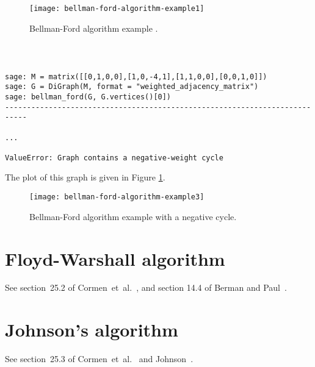 \begin{figure}[h!]
\begin{center}
\texttt{[image: bellman-ford-algorithm-example1]}
\end{center}
\caption{Bellman-Ford algorithm example . }
\label{fig:bellman-ford-algorithm-example1}
\end{figure}

%
\begin{center}
\fontsize{9pt}{9pt}
\selectfont
\tt
\begin{lstlisting}

sage: M = matrix([[0,1,0,0],[1,0,-4,1],[1,1,0,0],[0,0,1,0]])
sage: G = DiGraph(M, format = "weighted_adjacency_matrix")
sage: bellman_ford(G, G.vertices()[0])
---------------------------------------------------------------------------

...

ValueError: Graph contains a negative-weight cycle

\end{lstlisting}
\end{center}

The plot of this graph is given in Figure
\ref{fig:bellman-ford-algorithm-example1}.

\begin{figure}[h!]
\begin{center}
\texttt{[image: bellman-ford-algorithm-example3]}
\end{center}
\caption{Bellman-Ford algorithm example with a negative cycle. }
\label{fig:bellman-ford-algorithm-example3}
\end{figure}


\section{Floyd-Warshall algorithm}

See section~25.2 of Cormen~et~al.~\cite{CormenEtAl2001}, and section
14.4 of Berman and Paul~\cite{BermanPaul1997}.



\section{Johnson's algorithm}

See section~25.3 of Cormen~et~al.~\cite{CormenEtAl2001} and
Johnson~\cite{Johnson1977}.
